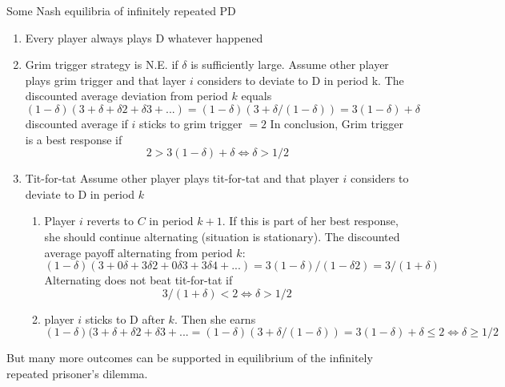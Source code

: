 \begin{illustration}
    Some Nash equilibria of infinitely repeated PD
    \begin{enumerate}

        \item Every player always plays D whatever happened
        \item Grim trigger strategy is N.E. if $\delta$ is sufficiently large. Assume other player plays grim trigger and that layer $i$ considers to deviate to D in period k. The discounted average deviation from period $k$ equals
              $(1-\delta)(3+\delta+\delta 2 +\delta 3 +...)=(1-\delta)(3+\delta/(1-\delta))=3(1-\delta)+ \delta$
              discounted average if $i$ sticks to grim trigger $ = 2$
              In conclusion, Grim trigger is a best response if
              $$2 > 3(1-\delta)+ \delta \iff \delta > 1/2$$
        \item  Tit-for-tat
              Assume other player plays tit-for-tat
              and that player $i$ considers to deviate to D in period $k$
              \begin{enumerate}


                  \item Player $i$ reverts to $C$ in period $k+1$. If this is part of her best response, she should continue alternating (situation is stationary). The discounted average payoff alternating from period $k$:
                        \[(1-\delta)(3+0\delta+3\delta 2 +0\delta 3 +3\delta 4 +...)=3(1-\delta)/(1-\delta 2 )=3/(1+\delta)
                        \]
                        Alternating does not beat tit-for-tat if
                        \[
                            3/(1+\delta) < 2 \iff \delta > 1/2
                        \]

                  \item player $i$ sticks to D after $k$. Then she earns
                        $$(1-\delta)(3+\delta+\delta 2 +\delta 3 +...=(1-\delta)(3+\delta/(1-\delta))=
                            3(1-\delta)+ \delta \le 2 \iff \delta \ge 1/2$$
              \end{enumerate}
    \end{enumerate}

    But many more outcomes can be supported in equilibrium of the infinitely repeated prisoner's dilemma.
\end{illustration}

